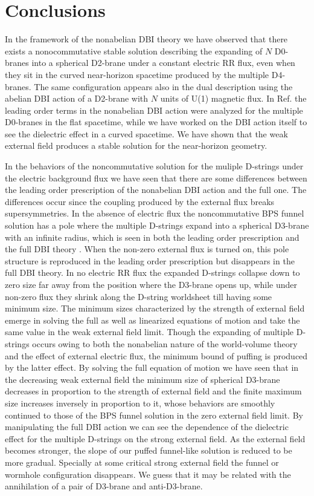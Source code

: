 \documentclass[12pt,a4paper]{article}
\begin{document}
\section{Conclusions}

In the framework of the nonabelian DBI theory we have observed that
there exists a nonocommutative stable solution describing 
the expanding of $N$ D0-branes into 
a  spherical D2-brane under a constant electric RR flux, even when
they sit in the curved near-horizon spacetime produced by the multiple
D4-branes. The same configuration appears also in the dual description 
using the abelian DBI action of a D2-brane with $N$ units of U(1) magnetic
flux. In Ref. \cite{RCM} the leading order terms in the nonabelian DBI 
action were analyzed for the multiple D0-branes in the flat spacetime,
while we have worked on the DBI action itself to see the dielectric 
effect in a curved spacetime. We have shown that the weak external 
field produces a stable solution for the near-horizon geometry.

In the behaviors of the noncommutative solution for the muliple D-strings
under the electric background flux we have seen that there are some
differences between the leading order prescription of the nonabelian
DBI action and the full one. The differences occur since the coupling
produced by the external flux breaks supersymmetries. 
In the absence of electric flux the
noncommutative BPS funnel solution has a pole where the multiple
D-strings expand into a spherical D3-brane with an infinite radius,
which is seen in both the leading order prescription and the full
DBI theory \cite{CMT}. When the non-zero external flux is turned on, this
pole structure is reproduced in the leading order prescription but
disappears in the full DBI theory. In no electric RR flux the 
expanded D-strings collapse down to zero size far away from the
position where the D3-brane opens up, while under non-zero flux they
shrink along the D-string worldsheet till having some minimum size.
The minimum sizes characterized by the strength of external field 
emerge in solving the full as well as linearized equations of motion
and take the same value in the weak external field limit.
Though the expanding of multiple D-strings occurs owing to both the
nonabelian nature of the world-volume theory and the effect of 
external electric flux, the minimum bound of puffing is 
produced by the latter effect. By solving the full equation of
motion we have seen that in the decreasing weak external field the minimum
size of spherical D3-brane decreases in proportion to the strength of
external field and the finite maximum size increases inversely in
proportion to it, whose behaviors are smoothly continued to those of
the BPS funnel solution in the zero external field limit.
By manipulating the full DBI action we can see the dependence of
the dielectric effect for the multiple D-strings on the strong
external field. As the external field becomes stronger, the slope of
our puffed funnel-like solution is reduced to be more gradual.
Specially at some critical strong external field the funnel
or wormhole configuration disappears. We guess that it may be 
related with the annihilation of a pair of D3-brane and
anti-D3-brane. 
\end{document}
